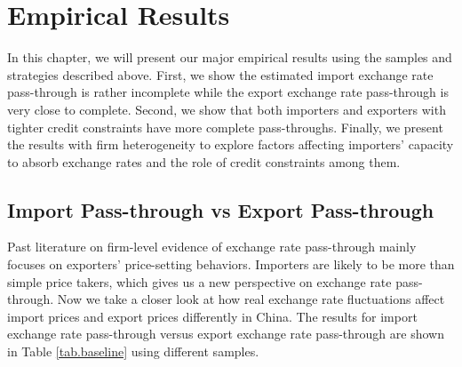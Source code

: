 \documentclass[12pt]{article}
\begin{document}
\section{Empirical Results} \label{Results}
In this chapter, we will present our major empirical results using the samples and strategies described above. First, we show the estimated import exchange rate pass-through is rather incomplete while the export exchange rate pass-through is very close to complete. Second, we show that both importers and exporters with tighter credit constraints have more complete pass-throughs. Finally, we present the results with firm heterogeneity to explore factors affecting importers' capacity to absorb exchange rates and the role of credit constraints among them.

\subsection{Import Pass-through vs Export Pass-through} \label{Results-Baseline}

Past literature on firm-level evidence of exchange rate pass-through mainly focuses on exporters' price-setting behaviors. Importers are likely to be more than simple price takers, which gives us a new perspective on exchange rate pass-through. Now we take a closer look at how real exchange rate fluctuations affect import prices and export prices differently in China. The results for import exchange rate pass-through versus export exchange rate pass-through are shown in Table \ref{tab.baseline} using different samples.
\end{document}
